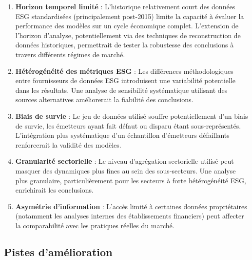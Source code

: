 \begin{enumerate}
  \item \textbf{Horizon temporel limité} : L'historique relativement court des données ESG standardisées (principalement post-2015) limite la capacité à évaluer la performance des modèles sur un cycle économique complet. L'extension de l'horizon d'analyse, potentiellement via des techniques de reconstruction de données historiques, permettrait de tester la robustesse des conclusions à travers différents régimes de marché.

  \item \textbf{Hétérogénéité des métriques ESG} : Les différences méthodologiques entre fournisseurs de données ESG introduisent une variabilité potentielle dans les résultats. Une analyse de sensibilité systématique utilisant des sources alternatives améliorerait la fiabilité des conclusions.

  \item \textbf{Biais de survie} : Le jeu de données utilisé souffre potentiellement d'un biais de survie, les émetteurs ayant fait défaut ou disparu étant sous-représentés. L'intégration plus systématique d'un échantillon d'émetteurs défaillants renforcerait la validité des modèles.

  \item \textbf{Granularité sectorielle} : Le niveau d'agrégation sectorielle utilisé peut masquer des dynamiques plus fines au sein des sous-secteurs. Une analyse plus granulaire, particulièrement pour les secteurs à forte hétérogénéité ESG, enrichirait les conclusions.

  \item \textbf{Asymétrie d'information} : L'accès limité à certaines données propriétaires (notamment les analyses internes des établissements financiers) peut affecter la comparabilité avec les pratiques réelles du marché.
\end{enumerate}

\subsection*{Pistes d'amélioration}

